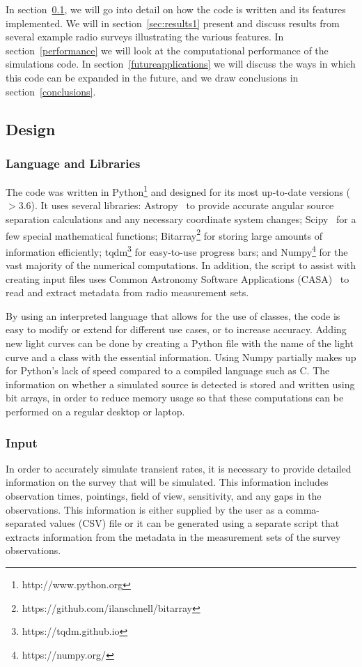 \documentclass[12pt]{article}
\begin{document}
In section~\ref{design}, we will go into detail on how the code is written and its features implemented. We will in section~\ref{sec:results1} present and discuss results from several example radio surveys illustrating the various features. In section~\ref{performance} we will look at the computational performance of the simulations code. In section~\ref{futureapplications} we will discuss the ways in which this code can be expanded in the future, and we draw conclusions in section~\ref{conclusions}. 



\subsection{Design}
\label{design}
\subsubsection{Language and Libraries}
The code was written in Python\footnote{http://www.python.org} and designed for its most up-to-date versions ($>3.6$). It uses several libraries: Astropy~\citep{2013A&A...558A..33A} to provide accurate angular source separation calculations and any necessary coordinate system changes; Scipy~\citep{2020NatMe..17..261V} for a few special mathematical functions; Bitarray\footnote{https://github.com/ilanschnell/bitarray} for storing large amounts of information efficiently; tqdm\footnote{https://tqdm.github.io} for easy-to-use progress bars; and Numpy\footnote{https://numpy.org/} for the vast majority of the numerical computations. In addition, the script to assist with creating input files uses Common Astronomy Software Applications (CASA)~\citep{2007ASPC..376..127M} to read and extract metadata from radio measurement sets. 

By using an interpreted language that allows for the use of classes, the code is easy to modify or extend for different use cases, or to increase accuracy. Adding new light curves can be done by creating a Python file with the name of the light curve and a class with the essential information. Using Numpy partially makes up for Python's lack of speed compared to a compiled language such as C. The information on whether a simulated source is detected is stored and written using bit arrays, in order to reduce memory usage so that these computations can be performed on a regular desktop or laptop. 

\subsubsection{Input}
In order to accurately simulate transient rates, it is necessary to provide detailed information on the survey that will be simulated. This information includes observation times, pointings, field of view, sensitivity, and any gaps in the observations. This information is either supplied by the user as a comma-separated values (CSV) file or it can be generated using a separate script that extracts information from the metadata in the measurement sets of the survey observations.
\end{document}
